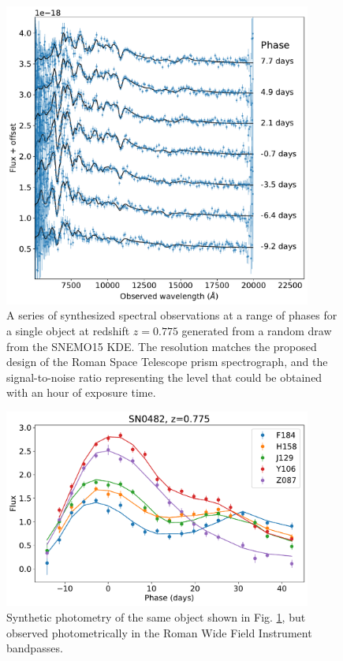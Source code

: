 \begin{figure}
    \centering
    \includegraphics[width=0.9\textwidth]{figures/snemo_kde/example_roman_spec.pdf}
    \caption{A series of synthesized spectral observations at a range of phases for a single object at redshift $z=0.775$ generated from a random draw from the SNEMO15 KDE. The resolution matches the proposed design of the Roman Space Telescope prism spectrograph, and the signal-to-noise ratio representing the level that could be obtained with an hour of exposure time.}
    \label{fig:example_prism_spec}
\end{figure}

\begin{figure}
    \centering
    \includegraphics[width=0.9\textwidth]{figures/snemo_kde/example_roman_lc.pdf}
    \caption{Synthetic photometry of the same object shown in Fig. \ref{fig:example_prism_spec}, but observed photometrically in the Roman Wide Field Instrument bandpasses.}
    \label{fig:example_roman_lc}
\end{figure}


